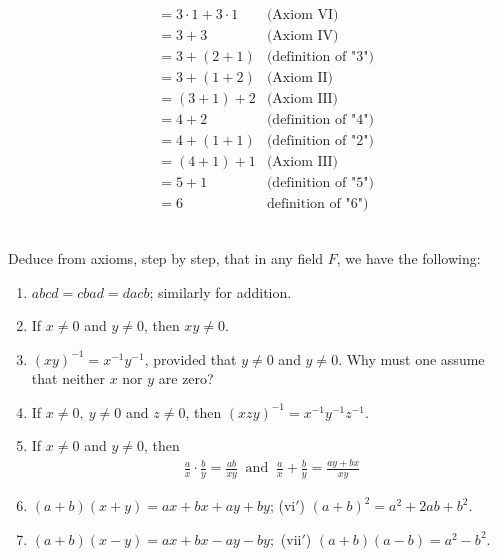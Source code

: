 \documentclass[12pt]{book}
\theoremstyle{definition}
\begin{document}
\begin{sol}
\begin{enumerate}[label=(\alph*)]
\begin{align*}
			&= 3 \cdot 1+3 \cdot 1 & \text{(Axiom VI)}\\
			&= 3+3 &\text{(Axiom IV)}\\
			&= 3+ (2+1) &\text{(definition of "3")}\\
			&= 3+(1+2) & \text{(Axiom II)}\\
			&= (3+1)+2 & \text{(Axiom III)}\\
			&= 4+2 & \text{(definition of "4")}\\
			&= 4+(1+1) & \text{(definition of "2")}\\
			&= (4+1)+1 & \text{(Axiom III)}\\
			&= 5 +1 & \text{(definition of "5")}\\
			&= 6 & \text{definition of "6")}	
		\end{align*}

\end{enumerate}	
\end{sol}
\begin{ex}[2]
\\
Deduce from axioms, step by step, that in any field $F$, we have the following:
\begin{enumerate}[label=(\roman*)]
	\item $abcd=cbad = dacb$; similarly for addition.
	\item If $x\neq 0$ and $y \neq 0$, then $xy\neq 0.$
	\item $(xy)^{-1}= x^{-1}y^{-1}$, provided that $y \neq 0$ and $y \neq 0$. Why must one assume that neither $x$ nor $y$ are zero?
	\item If $x\neq 0, \: y\neq 0$ and $z \neq 0$, then $(xzy)^{-1}=x^{-1}y^{-1}z^{-1}$.
	\item If $x\neq 0$ and $y \neq 0$, then
		\begin{align*}
			\frac{a}{x}\cdot \frac{b}{y}= \frac{ab}{xy} \;\; \text{and}\;\; \frac{a}{x}+\frac{b}{y} = \frac{ay+bx}{xy}
		\end{align*} 
	\item $(a+b)(x+y)=ax+bx+ay+by$; \;\; (vi$'$) \; $(a+b)^2=a^2+2ab +b^2.$
	\item $(a+b)(x-y)=ax+bx-ay-by;$ \;\; (vii$'$) \; $(a+b)(a-b)=a^2-b^2.$
\end{enumerate}
\end{ex}
\end{document}

